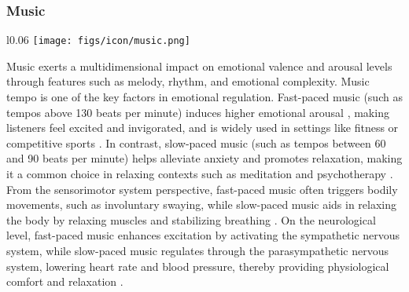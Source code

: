 \subsubsection{Music}
\begin{wrapfigure}{l}{0.06\textwidth}
        \texttt{[image: figs/icon/music.png]}
\end{wrapfigure} 
Music exerts a multidimensional impact on emotional valence and arousal levels through features such as melody, rhythm, and emotional complexity. Music tempo is one of the key factors in emotional regulation. Fast-paced music (such as tempos above 130 beats per minute) induces higher emotional arousal \cite{hofbauer2024background}, making listeners feel excited and invigorated, and is widely used in settings like fitness or competitive sports \cite{moon2024investigating}. In contrast, slow-paced music (such as tempos between 60 and 90 beats per minute) helps alleviate anxiety and promotes relaxation\cite{hofbauer2024background}, making it a common choice in relaxing contexts such as meditation and psychotherapy \cite{shepherd2024investigating}. From the sensorimotor system perspective, fast-paced music often triggers bodily movements, such as involuntary swaying, while slow-paced music aids in relaxing the body by relaxing muscles and stabilizing breathing \cite{thaut2015neurobiological, bernardi2006cardiovascular}. On the neurological level, fast-paced music enhances excitation by activating the sympathetic nervous system, while slow-paced music regulates through the parasympathetic nervous system, lowering heart rate and blood pressure, thereby providing physiological comfort and relaxation \cite{juslin2008emotional}.

